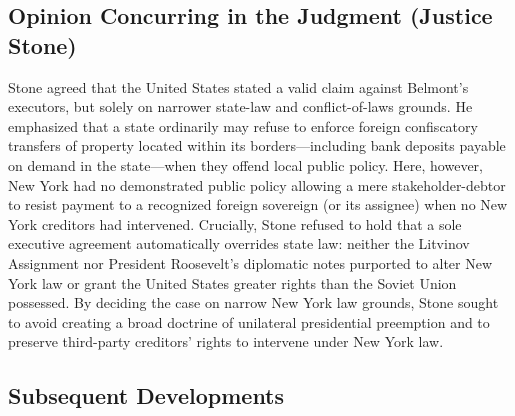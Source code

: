 \documentclass[12pt]{article}
\begin{document}
\subsection{Opinion Concurring in the Judgment (Justice Stone)}

Stone agreed that the United States stated a valid claim against Belmont's executors, but solely on narrower state-law and conflict-of-laws grounds. He emphasized that a state ordinarily may refuse to enforce foreign confiscatory transfers of property located within its borders---including bank deposits payable on demand in the state---when they offend local public policy. Here, however, New York had no demonstrated public policy allowing a mere stakeholder-debtor to resist payment to a recognized foreign sovereign (or its assignee) when no New York creditors had intervened. Crucially, Stone refused to hold that a sole executive agreement automatically overrides state law: neither the Litvinov Assignment nor President Roosevelt's diplomatic notes purported to alter New York law or grant the United States greater rights than the Soviet Union possessed. By deciding the case on narrow New York law grounds, Stone sought to avoid creating a broad doctrine of unilateral presidential preemption and to preserve third-party creditors' rights to intervene under New York law.

\subsection{Subsequent Developments}
\end{document}
